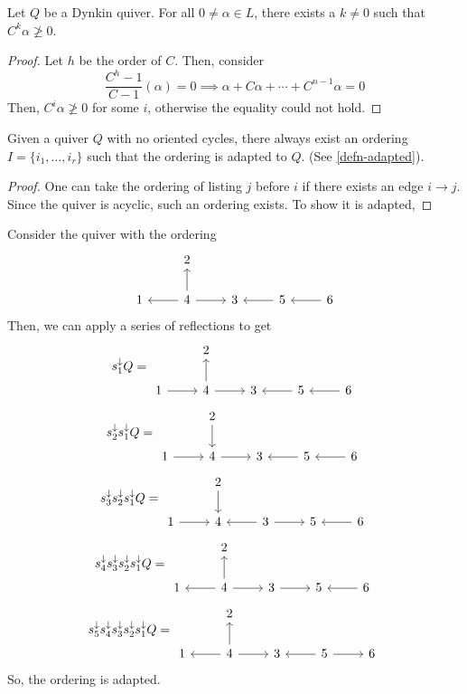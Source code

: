 \documentclass[11pt,leqno,oneside]{amsbook}
\numberwithin{thm}{section}
\renewcommand{\Q}{Q} %
\newcommand{\sinktosource}{s^\downarrow} %
\begin{document}
\begin{prop}\label{coxeter-gets-not-positive}
  Let \(\Q\) be a Dynkin quiver. For all \(0 \neq \alpha \in L\), there exists a \(k \neq 0\) such
  that \(C^k \alpha \not \geq 0\).
\end{prop}
\begin{proof}
  Let \(h\) be the order of \(C\). Then, consider
  \[
    \frac{C^h-1}{C-1}(\alpha) = 0 \implies \alpha + C \alpha + \cdots
    + C^{n-1} \alpha = 0
  \]
  Then, \(C^i \alpha \not \geq 0\) for some \(i\), otherwise the
  equality could not hold.
\end{proof}
\begin{lem}
  Given a quiver \(\Q\) with no oriented cycles, there always exist an
  ordering \(I = \{i_1, \ldots, i_r\}\) such that the ordering is
  adapted to \(\Q\). (See \ref{defn-adapted}). 
\end{lem}
\begin{proof}
  One can take the ordering of listing \(j\) before \(i\) if there
  exists an edge \(i \to j\). Since the quiver is acyclic, such an
  ordering exists. To show it is adapted, 
\end{proof}
\begin{example}
  Consider the quiver with the ordering \[
    \begin{tikzcd}
       & 2 &   &   & \\
      1& \lar 4 \rar \uar & 3 & \lar 5 & \lar 6
    \end{tikzcd}
  \]
  Then, we can apply a series of reflections to get \[
    \sinktosource_1 \Q =
    \begin{tikzcd}
       & 2 &   &   & \\
      1 \rar & 4 \rar \uar & 3 & \lar 5 & \lar 6
    \end{tikzcd}
  \] \[
    \sinktosource_2 \sinktosource_1 \Q =
    \begin{tikzcd}
       & 2 \dar &   &   & \\
      1 \rar & 4 \rar & 3 & \lar 5 & \lar 6
    \end{tikzcd}
  \] \[
    \sinktosource_3 \sinktosource_2 \sinktosource_1 \Q =
    \begin{tikzcd}
       & 2 \dar &   &   & \\
      1 \rar & 4  & \lar 3 \rar &  5 & \lar 6
    \end{tikzcd}
  \] \[
    \sinktosource_4 \sinktosource_3 \sinktosource_2 \sinktosource_1 \Q =
    \begin{tikzcd}
       & 2 &   &   & \\
      1  &\lar \uar 4 \rar &  3 \rar &  5 & \lar 6
    \end{tikzcd}
  \] \[
  \sinktosource_5 \sinktosource_4 \sinktosource_3 \sinktosource_2 \sinktosource_1 \Q =
    \begin{tikzcd}
       & 2 &   &   & \\
      1  &\lar \uar 4 \rar &  3  &\lar  5 \rar &  6
    \end{tikzcd}
  \]
  So, the ordering is adapted.
\end{example}
\end{document}
